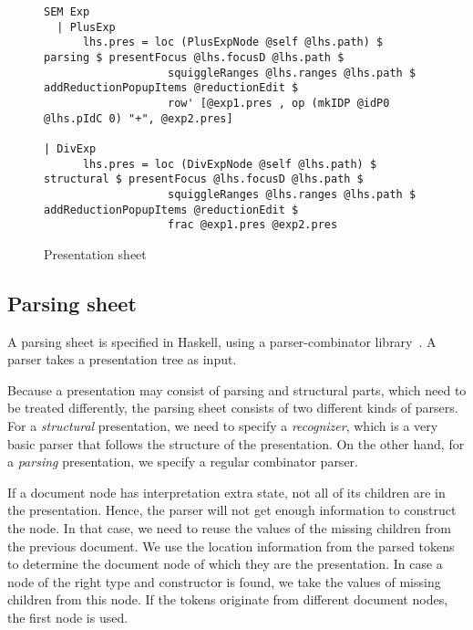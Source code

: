 \bc
\begin{figure}
\begin{small}
\begin{center}
\begin{footnotesize}
\begin{verbatim}
SEM Exp
  | PlusExp
      lhs.pres = loc (PlusExpNode @self @lhs.path) $ parsing $ presentFocus @lhs.focusD @lhs.path $
                   squiggleRanges @lhs.ranges @lhs.path $ addReductionPopupItems @reductionEdit $
                   row' [@exp1.pres , op (mkIDP @idP0 @lhs.pIdC 0) "+", @exp2.pres]

| DivExp      
      lhs.pres = loc (DivExpNode @self @lhs.path) $ structural $ presentFocus @lhs.focusD @lhs.path $
                   squiggleRanges @lhs.ranges @lhs.path $ addReductionPopupItems @reductionEdit $
                   frac @exp1.pres @exp2.pres
\end{verbatim}
\end{footnotesize}
\caption{Presentation sheet}\label{presSheetExample} 
\end{center}
\end{small}
\end{figure}
\ec

\subsection{Parsing sheet}

A parsing sheet is specified in Haskell, using a parser-combinator library~\cite{swierstra01parsers}. A parser takes a presentation tree as input.

Because a presentation may consist of parsing and structural parts, which need to be treated differently, the parsing sheet consists of two different kinds of parsers. For a {\em structural} presentation, we need to specify a {\em recognizer}, which is a very basic parser that follows the structure of the presentation. On the other hand, for a {\em parsing} presentation, we specify a regular combinator parser. 

If a document node has interpretation extra state, not all of its children are in the presentation. Hence, the parser will not get enough information to construct the node. In that case, we need to reuse the values of the missing children from the previous document. We use the location information from the parsed tokens to determine the document node of which they are the presentation. In case a node of the right type and constructor is found, we take the values of missing children from this node. If the tokens originate from different document nodes, the first node is used.

